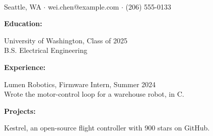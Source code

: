 \documentclass[letterpaper,11pt]{article}
\begin{document}
\\
Seattle, WA $\cdot$ wei.chen@example.com $\cdot$ (206) 555-0133

\bigskip\noindent \textbf{Education:}

\noindent University of Washington, Class of 2025\\
B.S. Electrical Engineering

\bigskip\noindent \textbf{Experience:}

\noindent Lumen Robotics, Firmware Intern, Summer 2024\\
Wrote the motor-control loop for a warehouse robot, in C.

\bigskip\noindent \textbf{Projects:}

\noindent Kestrel, an open-source flight controller with 900 stars on GitHub.
\end{document}
